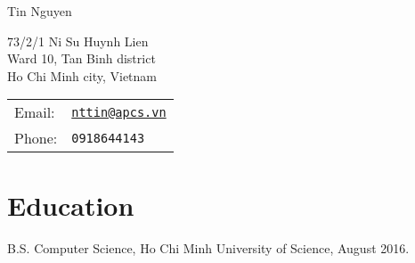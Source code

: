 \documentclass[letterpaper]{article}
\def\name{Tin Nguyen}
\renewenvironment{itemize}{
  \begin{list}{}{
    \setlength{\leftmargin}{1.5em}
  }
}{
  \end{list}
}
\begin{document}
{\huge \name}


\vspace{0.25in}

\begin{minipage}{0.45\linewidth}
  73/2/1 Ni Su Huynh Lien\\
  Ward 10, Tan Binh district\\
 Ho Chi Minh city, Vietnam\\
 
\end{minipage}
\begin{minipage}{0.45\linewidth}
  \begin{tabular}{ll}
    Email: & \href{mailto:nttin@apcs.vn}{\tt nttin@apcs.vn} \\
    Phone: & {\tt 0918644143} \\
  \end{tabular}
\end{minipage}

\section*{Education}

\begin{itemize}
  \item B.S. Computer Science, Ho Chi Minh University of Science, August 2016. 
\end{itemize}
\end{document}
